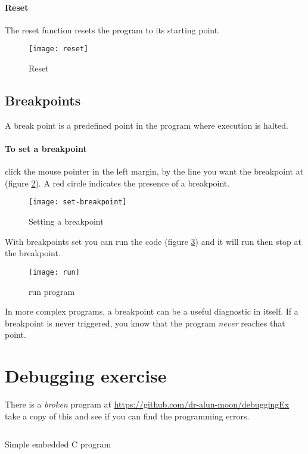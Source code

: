 \documentclass[a4paper]{tufte-handout}
\begin{document}
\clearpage
\paragraph{Reset}  The reset function resets the program to its starting
point.
\begin{figure}
  \texttt{[image: reset]}
  \caption{Reset }
  \label{fig:reset}
\end{figure}
\subsection{Breakpoints}
  A break point is a
predefined point in the program where execution is halted.
\paragraph{To set a breakpoint} click the mouse pointer in the left
margin, by the line you want the breakpoint at (figure
\ref{fig:set-break}).  A red circle indicates the presence of a breakpoint.
\begin{figure}
  \texttt{[image: set-breakpoint]}
  \caption{Setting a breakpoint}
  \label{fig:set-break}
\end{figure}
With breakpoints set you can run the code (figure \ref{fig:run}) and
it will run then stop at the breakpoint.
\begin{figure}
  \texttt{[image: run]}
  \caption{run program}
  \label{fig:run}
\end{figure}
\begin{tcolorbox}[colframe=red!50!black]
In more complex programs, a breakpoint can be a useful diagnostic in
itself.  If a breakpoint is never triggered, you know that the program
\emph{never} reaches that point.  
\end{tcolorbox}

\section{Debugging exercise}
There is a \emph{broken} program at
\url{https://github.com/dr-alun-moon/debuggingEx} 
take a copy of this and see if you can find the programming errors.

\appendix
\begin{listing}
  \inputminted[linenos]{c}{embeddedC/src/main.c}
  \caption{Simple embedded C program}
  \label{lst:simple}
\end{listing}

%
%
\end{document}
